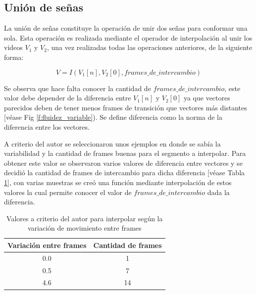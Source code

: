 \subsection{Unión de señas}

La unión de señas constituye la operación de unir dos señas para conformar una sola. Esta operación
es realizada mediante el operador de interpolación al unir los videos $V_1$ y $V_2$, una vez realizadas todas 
las operaciones anteriores, de la siguiente forma:

\begin{equation}
V = I(V_1[n], V_2[0], frames\_de\_intercambio)
\end{equation}

Se observa que hace falta conocer la cantidad de $frames\_de\_intercambio$, este valor debe depender de la diferencia
entre $V_1[n]$ y $V_2[0]$ ya que vectores parecidos deben de tener menos frames de transición que vectores más distantes [véase Fig \ref{f:fluidez_variable}).
Se define diferencia como la norma de la diferencia entre los vectores.

A criterio del autor se seleccionaron unos ejemplos en donde se sabía la variabilidad y la cantidad de frames buenas para el segmento a interpolar. Para obtener este valor se observaron varios valores de diferencia entre vectores y se decidió la cantidad de frames de 
intercambio para dicha diferencia [véase Tabla \ref{table:intercambio_frame}], con varias muestras se creó una función mediante interpolación de estos valores la cual 
permite conocer el valor de $frames\_de\_intercambio$ dada la diferencia.


\begin{table}[h!]
	\begin{center}
	  \caption{Valores a criterio del autor para interpolar según la variación de movimiento entre frames }
	  \label{table:intercambio_frame}
	  \begin{tabular}{c|c} 
		\textbf{Variación entre frames} & \textbf{Cantidad de frames}\\
		\hline
		0.0 & 1 \\
		0.5 & 7 \\
		4.6 & 14\\
	  \end{tabular}
	\end{center}
  \end{table}

